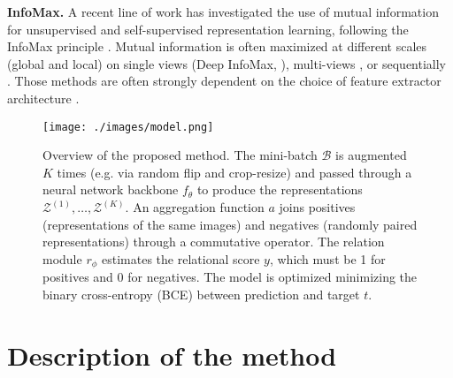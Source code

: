 \documentclass{article}
\begin{document}
\textbf{InfoMax.} A recent line of work has investigated the use of mutual information for unsupervised and self-supervised representation learning, following the InfoMax principle \citep{linsker1988self}.
Mutual information is often maximized at different scales (global and local) on single views (Deep InfoMax, \citealt{hjelm2018learning}), multi-views \citep{bachman2019learning, ji2019invariant}, or sequentially \citep{oord2018representation}.
Those methods are often strongly dependent on the choice of feature extractor architecture \citep{tschannen2020mutual}.

\begin{figure}[t]
 \centering
 \texttt{[image: ./images/model.png]}
 \caption{Overview of the proposed method. The mini-batch $\mathcal{B}$ is augmented $K$ times (e.g. via random flip and crop-resize) and passed through a neural network backbone $f_{\theta}$ to produce the representations $\mathcal{Z}^{(1)}, \ldots, \mathcal{Z}^{(K)}$. An aggregation function $a$ joins positives (representations of the same images) and negatives (randomly paired representations) through a commutative operator. The relation module $r_{\phi}$ estimates the relational score $y$, which must be 1 for positives and 0 for negatives. The model is optimized minimizing the binary cross-entropy (BCE) between prediction and target $t$.}
 \label{fig:model_overview}
\end{figure}

\section{Description of the method}\label{sec:method}
\end{document}
